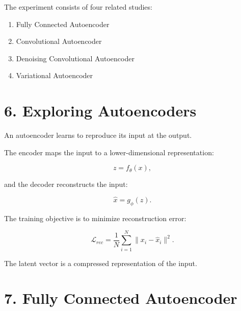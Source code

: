 \documentclass[10pt]{article}
\begin{document}
The experiment consists of four related studies:

\begin{enumerate}
\item Fully Connected Autoencoder
\item Convolutional Autoencoder
\item Denoising Convolutional Autoencoder
\item Variational Autoencoder
\end{enumerate}

\section*{6. Exploring Autoencoders}

An autoencoder learns to reproduce its input at the output.

The encoder maps the input to a lower-dimensional representation:

\[
z=f_{\theta}(x),
\]

and the decoder reconstructs the input:

\[
\hat{x}=g_{\phi}(z).
\]

The training objective is to minimize reconstruction error:

\[
\mathcal{L}_{rec}
=
\frac{1}{N}\sum_{i=1}^{N}
\|x_i-\hat{x}_i\|^2.
\]

\begin{center}
\end{center}

The latent vector is a compressed representation of the input.

\section*{7. Fully Connected Autoencoder}
\end{document}

